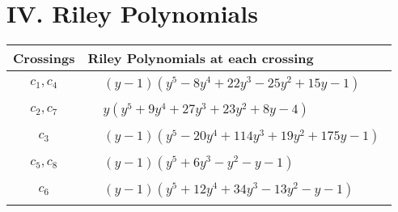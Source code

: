 \documentclass[1p]{elsarticle_modified}
\theoremstyle{definition}
\begin{document}
\centering \section*{ IV. Riley Polynomials}
\begin{tabular}{m{50pt}|m{274pt}}
Crossings & \hspace{64pt}Riley Polynomials at each crossing \\
\hline $$\begin{aligned}c_{1},c_{4}\end{aligned}$$&$\begin{aligned}
&(y-1)(y^5-8 y^4+22 y^3-25 y^2+15 y-1)
\end{aligned}$\\
\hline $$\begin{aligned}c_{2},c_{7}\end{aligned}$$&$\begin{aligned}
&y(y^5+9 y^4+27 y^3+23 y^2+8 y-4)
\end{aligned}$\\
\hline $$\begin{aligned}c_{3}\end{aligned}$$&$\begin{aligned}
&(y-1)(y^5-20 y^4+114 y^3+19 y^2+175 y-1)
\end{aligned}$\\
\hline $$\begin{aligned}c_{5},c_{8}\end{aligned}$$&$\begin{aligned}
&(y-1)(y^5+6 y^3- y^2- y-1)
\end{aligned}$\\
\hline $$\begin{aligned}c_{6}\end{aligned}$$&$\begin{aligned}
&(y-1)(y^5+12 y^4+34 y^3-13 y^2- y-1)
\end{aligned}$\\
\hline
\end{tabular}
\vskip 2pc
\end{document}
